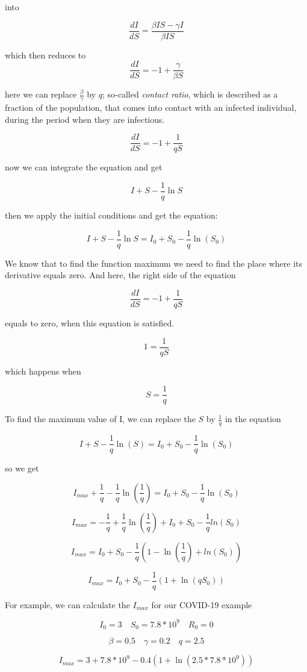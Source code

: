 \documentclass[nostrict]{szablonPG}
\begin{document}
into 

\[\frac{dI}{dS} = \frac{\beta I S - \gamma I}{\beta I S}\]

which then reduces to 
\[\frac{dI}{dS} = -1 + \frac{\gamma}{\beta S}\]

here we can replace $\frac{\beta}{\gamma}$ by $q$; so-called \textit{contact ratio}, which is described as a fraction of the population, that comes into contact with an infected individual, during the period when they are infectious.

\[\frac{dI}{dS} = -1 + \frac{1}{q S}\]

now we can integrate the equation and get

\[I + S - \frac{1}{q} \ln{S}\]

then we apply the initial conditions and get the equation:

\[I + S - \frac{1}{q} \ln{S} = I_0 + S_0 - \frac{1}{q} \ln(S_0)\]

We know that to find the function maximum we need to find the place where its derivative equals zero. And here, the right side of the equation 

\[\frac{dI}{dS} = -1 + \frac{1}{q S}\]

equals to zero, when this equation is satisfied.

\[1 = \frac{1}{q S}\]

which happens when 

\[S = \frac{1}{q}\]

To find the maximum value of I, we can replace the $S$ by $\frac{1}{q}$ in the equation

\[I + S - \frac{1}{q} \ln(S) = I_0 + S_0 - \frac{1}{q} \ln(S_0)\]

so we get

\[I_{max} + \frac{1}{q} - \frac{1}{q} \ln(\frac{1}{q}) = I_0 + S_0 - \frac{1}{q} \ln(S_0)\]

\[I_{max} = - \frac{1}{q} + \frac{1}{q}\ln(\frac{1}{q}) + I_0 + S_0 -\frac{1}{q}ln(S_0)\]

\[I_{max} = I_0 + S_0 - \frac{1}{q} ( 1 - \ln(\frac{1}{q}) + ln(S_0))\]

\[I_{max} = I_0 + S_0 - \frac{1}{q} ( 1 + \ln(q S_0))\]

For example, we can calculate the $I_{max}$ for our COVID-19 example 

\[I_0 = 3 \quad S_0 = 7.8 * 10^9 \quad R_0 = 0\]

\[\beta = 0.5 \quad \gamma = 0.2 \quad q = 2.5\]

\[I_{max} = 3 + 7.8 * 10^9 - 0.4 ( 1 + \ln(2.5 * 7.8 * 10^9))\]
\end{document}
